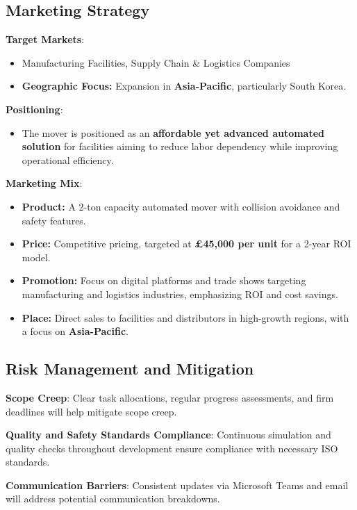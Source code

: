 \documentclass[12pt]{article}
\begin{document}
\subsection*{Marketing Strategy}

\textbf{Target Markets}:
\begin{itemize}
    \item Manufacturing Facilities, Supply Chain \& Logistics Companies
    \item \textbf{Geographic Focus:} Expansion in \textbf{Asia-Pacific}, particularly South Korea.
\end{itemize}

\textbf{Positioning}:
\begin{itemize}
    \item The mover is positioned as an \textbf{affordable yet advanced automated solution} for facilities aiming to reduce labor dependency while improving operational efficiency.
\end{itemize}

\textbf{Marketing Mix}:
\begin{itemize}
    \item \textbf{Product:} A 2-ton capacity automated mover with collision avoidance and safety features.
    \item \textbf{Price:} Competitive pricing, targeted at \textbf{£45,000 per unit} for a 2-year ROI model.
    \item \textbf{Promotion:} Focus on digital platforms and trade shows targeting manufacturing and logistics industries, emphasizing ROI and cost savings.
    \item \textbf{Place:} Direct sales to facilities and distributors in high-growth regions, with a focus on \textbf{Asia-Pacific}.
\end{itemize}

\subsection*{Risk Management and Mitigation}

\textbf{Scope Creep}: Clear task allocations, regular progress assessments, and firm deadlines will help mitigate scope creep.

\textbf{Quality and Safety Standards Compliance}: Continuous simulation and quality checks throughout development ensure compliance with necessary ISO standards.

\textbf{Communication Barriers}: Consistent updates via Microsoft Teams and email will address potential communication breakdowns.
\end{document}
